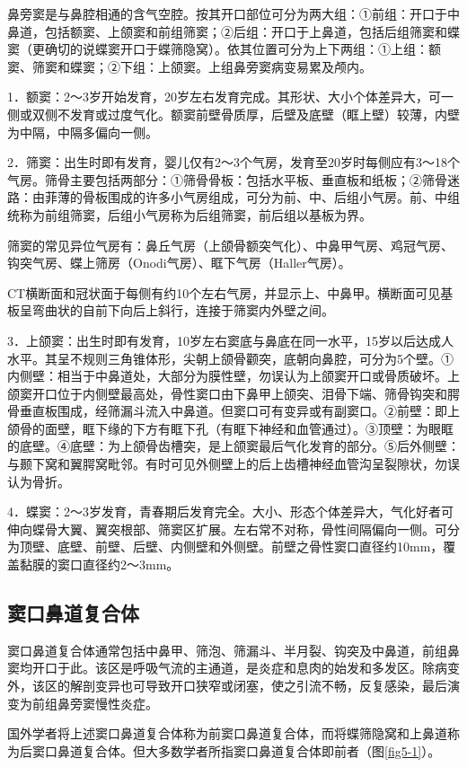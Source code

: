 鼻旁窦是与鼻腔相通的含气空腔。按其开口部位可分为两大组：①前组：开口于中鼻道，包括额窦、上颌窦和前组筛窦；②后组：开口于上鼻道，包括后组筛窦和蝶窦（更确切的说蝶窦开口于蝶筛隐窝）。依其位置可分为上下两组：①上组：额窦、筛窦和蝶窦；②下组：上颌窦。上组鼻旁窦病变易累及颅内。

1．额窦：2～3岁开始发育，20岁左右发育完成。其形状、大小个体差异大，可一侧或双侧不发育或过度气化。额窦前壁骨质厚，后壁及底壁（眶上壁）较薄，内壁为中隔，中隔多偏向一侧。

2．筛窦：出生时即有发育，婴儿仅有2～3个气房，发育至20岁时每侧应有3～18个气房。筛骨主要包括两部分：①筛骨骨板：包括水平板、垂直板和纸板；②筛骨迷路：由菲薄的骨板围成的许多小气房组成，可分为前、中、后组小气房。前、中组统称为前组筛窦，后组小气房称为后组筛窦，前后组以基板为界。

筛窦的常见异位气房有：鼻丘气房（上颌骨额突气化）、中鼻甲气房、鸡冠气房、钩突气房、蝶上筛房（Onodi气房）、眶下气房（Haller气房）。

CT横断面和冠状面于每侧有约10个左右气房，并显示上、中鼻甲。横断面可见基板呈弯曲状的自前下向后上斜行，连接于筛窦内外壁之间。

3．上颌窦：出生时即有发育，10岁左右窦底与鼻底在同一水平，15岁以后达成人水平。其呈不规则三角锥体形，尖朝上颌骨颧突，底朝向鼻腔，可分为5个壁。①内侧壁：相当于中鼻道处，大部分为膜性壁，勿误认为上颌窦开口或骨质破坏。上颌窦开口位于内侧壁最高处，骨性窦口由下鼻甲上颌突、泪骨下端、筛骨钩突和腭骨垂直板围成，经筛漏斗流入中鼻道。但窦口可有变异或有副窦口。②前壁：即上颌骨的面壁，眶下缘的下方有眶下孔（有眶下神经和血管通过）。③顶壁：为眼眶的底壁。④底壁：为上颌骨齿槽突，是上颌窦最后气化发育的部分。⑤后外侧壁：与颞下窝和翼腭窝毗邻。有时可见外侧壁上的后上齿槽神经血管沟呈裂隙状，勿误认为骨折。

4．蝶窦：2～3岁发育，青春期后发育完全。大小、形态个体差异大，气化好者可伸向蝶骨大翼、翼突根部、筛窦区扩展。左右常不对称，骨性间隔偏向一侧。可分为顶壁、底壁、前壁、后壁、内侧壁和外侧壁。前壁之骨性窦口直径约10mm，覆盖黏膜的窦口直径约2～3mm。

\subsection{窦口鼻道复合体}

窦口鼻道复合体通常包括中鼻甲、筛泡、筛漏斗、半月裂、钩突及中鼻道，前组鼻窦均开口于此。该区是呼吸气流的主通道，是炎症和息肉的始发和多发区。除病变外，该区的解剖变异也可导致开口狭窄或闭塞，使之引流不畅，反复感染，最后演变为前组鼻旁窦慢性炎症。

国外学者将上述窦口鼻道复合体称为前窦口鼻道复合体，而将蝶筛隐窝和上鼻道称为后窦口鼻道复合体。但大多数学者所指窦口鼻道复合体即前者（图\ref{fig5-1}）。

